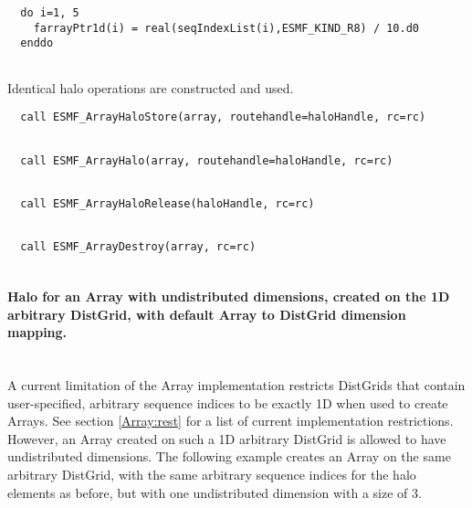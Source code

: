  \begin{verbatim}
  do i=1, 5
    farrayPtr1d(i) = real(seqIndexList(i),ESMF_KIND_R8) / 10.d0
  enddo
 
\end{verbatim}
 

   Identical halo operations are constructed and used. 

 \begin{verbatim}
  call ESMF_ArrayHaloStore(array, routehandle=haloHandle, rc=rc)
 
\end{verbatim}
 

 \begin{verbatim}
  call ESMF_ArrayHalo(array, routehandle=haloHandle, rc=rc)
 
\end{verbatim}
 

 \begin{verbatim}
  call ESMF_ArrayHaloRelease(haloHandle, rc=rc)
 
\end{verbatim}
 

 \begin{verbatim}
  call ESMF_ArrayDestroy(array, rc=rc)
 
\end{verbatim}
 

   \paragraph{Halo for an Array with undistributed dimensions, created on
   the 1D arbitrary DistGrid, with default Array to DistGrid dimension mapping.}
   \mbox{} \\
  
   A current limitation of the Array implementation restricts DistGrids that
   contain user-specified, arbitrary sequence indices to be exactly 1D
   when used to create Arrays. See section \ref{Array:rest} for a list of 
   current implementation restrictions. However, an Array created on such a
   1D arbitrary DistGrid is allowed to have undistributed dimensions. The
   following example creates an Array on the same arbitrary DistGrid, with the
   same arbitrary sequence indices for the halo elements as before, but with
   one undistributed dimension with a size of 3. 


